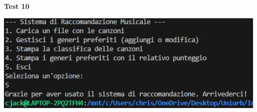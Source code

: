 \documentclass[a4paper,11pt]{article}
\begin{document}
    \begin{center}
        \textbf{Test 10}
        \par
        \vspace{0.5cm}
        \includegraphics[width=1\textwidth]{Immagini/Tests/htest10}
    \end{center}
    \vspace{1cm}

    \newpage
\end{document}
